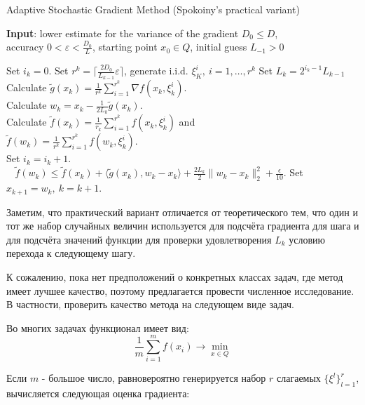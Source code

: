 \documentclass[]{scrartcl}
\begin{document}
\begin{algorithm}[h!]
	\caption{Adaptive Stochastic Gradient Method (Spokoiny's practical variant)}
	\hspace*{\algorithmicindent} \textbf{Input}: lower estimate for the variance of the gradient $D_0 \le D$,\\ accuracy $0 < \varepsilon< \frac{D_0}{L}$, starting point $x_0 \in Q$, initial guess $L_{-1} > 0$
	\label{RKalg}
	\begin{algorithmic}[1] 
		\STATE Set $i_k=0$. Set $r^k = \lceil \frac{2 D_0}{L_{k-1}} {\varepsilon}\rceil$, generate i.i.d. $\xi^i_K, ~i = 1,\dots, r^k$
	    \REPEAT
		\STATE Set $L_k = 2 ^{i_k-1}L_{k-1}$
		\\
		\STATE Calculate $\tilde{g}(x_k) = \frac{1}{r^k}\sum_{i=1}^{r^k}\nabla f(x_k, \xi^i_k)$.
		\\
		\STATE Calculate $w_k = x_k - \frac{1}{2 L_k}\tilde{g}(x_k)$.
		\\
		\STATE Calculate $\tilde{f}(x_k) = \frac{1}{r_k}\sum_{i=1}^{r^k}f(x_k, \xi^i_k)$ and\\ $\tilde{f}(w_k) = \frac{1}{r^k}\sum_{i=1}^{r^k}f(w_k, \xi^i_k)$.
		\\
		\STATE Set $i_k = i_k + 1$.
		\UNTIL \\$~~~~\tilde{f}(w_k) \le \tilde{f}(x_k) + \langle\tilde{g}(x_k), w_k - x_k\rangle + \frac{2 L_k}{2}\|w_k - x_k\|_2^2 + \frac{\epsilon}{10}$.
		\STATE Set $x_{k+1} = w_k,~k=k+1$.
		\ENDFOR
	\end{algorithmic}
\end{algorithm}

Заметим, что практический вариант отличается от теоретического тем, что один и тот же набор случайных величин используется для подсчёта градиента для шага и для подсчёта значений функции для проверки удовлетворения $L_k$ условию перехода к следующему шагу.

К сожалению, пока нет предположений о конкретных классах задач, где метод имеет лучшее качество, поэтому предлагается провести численное исследование. В частности, проверить качество метода на следующем виде задач.

Во многих задачах функционал имеет вид:
\begin{equation}
\frac{1}{m}\sum\limits_{i=1}^m f(x_i) \rightarrow  \underset{x \in Q}{\min}
\end{equation}

Если $m$ - большое число, равновероятно генерируется набор $r$ слагаемых $\{\xi^l\}_{l=1}^r$, вычисляется следующая  оценка градиента:
\end{document}
